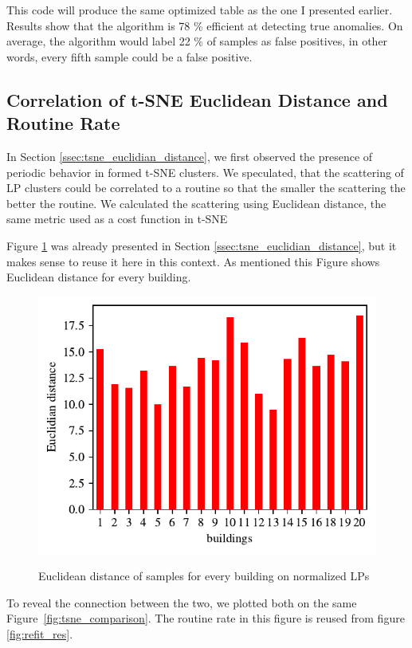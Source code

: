 This code will produce the same optimized table as the one I presented earlier.
Results show that the algorithm is 78 \% efficient at detecting true anomalies. 
On average, the algorithm would label 22 \% of samples as false positives, 
in other words, every fifth sample could be a false positive. 

\subsection{Correlation of t-SNE Euclidean Distance and Routine Rate}

In Section \ref{ssec:tsne_euclidian_distance}, we first observed the presence of periodic behavior in formed t-SNE clusters.
We speculated, that the scattering of LP clusters could be correlated to a routine so that the smaller the scattering the better the routine.
We calculated the scattering using Euclidean distance, the same metric used as a cost function in t-SNE

Figure \ref{fig:tsne_euclidian2} was already presented in Section \ref{ssec:tsne_euclidian_distance},
but it makes sense to reuse it here in this context. 
As mentioned this Figure shows Euclidean distance for every building.

\begin{figure}[H]
	\centering
	\caption{Euclidean distance of samples for every building on normalized LPs}
	\includegraphics[]{Figures/EC/CORR_TSNE/tnse_euclidian.pdf}
	\label{fig:tsne_euclidian2}
\end{figure}

To reveal the connection between the two, we plotted both on the same Figure \ref{fig:tsne_comparison}.
The routine rate in this figure is reused from figure \ref{fig:refit_res}.

